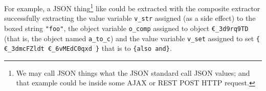 For example, a JSON thing\footnote{We may call JSON things what the
  JSON standard call JSON values; and that example could be inside
  some AJAX or REST POST HTTP request.} like {} could be extracted with the composite extractor
{} successfully extracting
the value variable \texttt{v\_str} assigned (as a side effect) to the
boxed string \texttt{"foo"}, the object variable \texttt{o\_comp}
assigned to object \texttt{€\_3d9rq9TD} (that is, the object named
\texttt{a\_to\_c}) and the value variable \texttt{v\_set} assigned to
set \texttt{\{ €\_3dmcFZldt €\_6vMEdC0qxd \}} that is to
\texttt{\{also and\}}.


